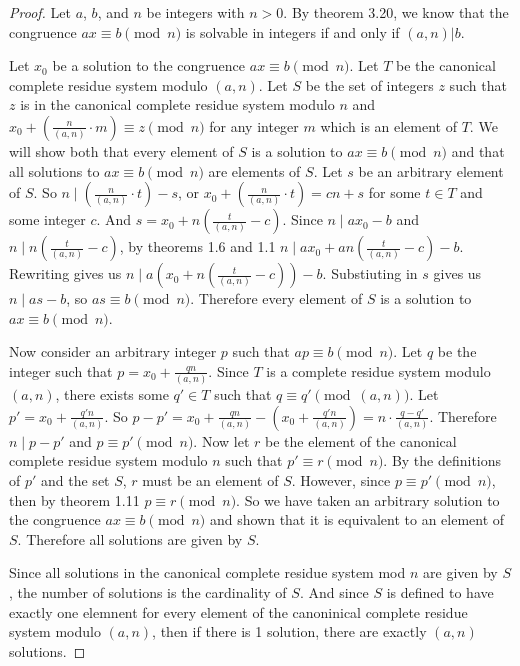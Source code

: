 \documentclass[12pt,leqno]{article}
\numberwithin{equation}{section}
\theoremstyle{definition}
\begin{document}
\pagebreak
\begin{proof}[Proof]
Let $a$, $b$, and $n$ be integers with $n > 0$.  By theorem 3.20, we know that the congruence $ax \equiv b \pmod{n}$ is solvable in integers if and only if $(a,n)|b$.  

Let $x_0$ be a solution to the congruence $ax \equiv b\pmod{n}$. Let $T$ be the canonical complete residue system modulo $(a, n)$.  Let $S$ be the set of integers $z$ such that $z$ is in the canonical complete residue system modulo $n$ and $x_0 + \left(\frac{n}{(a,n)}\cdot m\right) \equiv z \pmod{n}$ for any integer $m$ which is an element of $T$.  We will show both that every element of $S$ is a solution to $ax \equiv b\pmod{n}$ and that all solutions to $ax \equiv b\pmod{n}$ are elements of $S$.  Let $s$ be an arbitrary element of $S$.  So $n \mid \left(\frac{n}{(a,n)}\cdot t\right) - s$, or $x_0 + \left(\frac{n}{(a,n)}\cdot t\right) = cn + s$ for some $t \in T$ and some integer $c$.  And $s = x_0 + n\left(\frac{t}{(a,n)} - c\right)$.  Since $n \mid ax_0 - b$ and $n \mid n\left(\frac{t}{(a,n)} - c\right)$, by theorems 1.6 and 1.1 $n \mid ax_0 + an\left(\frac{t}{(a,n)} - c\right) - b$.  Rewriting gives us $n \mid a\left(x_0 + n\left(\frac{t}{(a,n)} - c\right)\right) - b$.  Substiuting in $s$ gives us $n \mid as - b$, so $as \equiv b \pmod{n}$.  Therefore every element of $S$ is a solution to $ax \equiv b \pmod{n}$.

Now consider an arbitrary integer $p$ such that $ap \equiv b \pmod{n}$.  Let $q$ be the integer such that $p = x_0 + \frac{qn}{(a, n)}$.  Since $T$ is a complete residue system modulo $(a, n)$, there exists some $q' \in T$ such that $q \equiv q' \pmod{(a, n)}$.  Let $p' = x_0 + \frac{q'n}{(a, n)}$.  So $p - p' = x_0 + \frac{qn}{(a, n)} - \left(x_0 + \frac{q'n}{(a, n)}\right) = n \cdot \frac{q - q'}{(a, n)}$.  Therefore $n \mid p - p'$ and $p \equiv p' \pmod{n}$.  Now let $r$ be the element of the canonical complete residue system modulo $n$ such that $p' \equiv r \pmod{n}$.  By the definitions of $p'$ and the set $S$, $r$ must be an element of $S$.  However, since $p \equiv p' \pmod{n}$, then by theorem 1.11 $p \equiv r \pmod{n}$.  So we have taken an arbitrary solution to the congruence $ax \equiv b \pmod{n}$ and shown that it is equivalent to an element of $S$.  Therefore all solutions are given by $S$.

Since all solutions in the canonical complete residue system mod $n$ are given by $S$, the number of solutions is the cardinality of $S$.  And since $S$ is defined to have exactly one elemnent for every element of the canoninical complete residue system modulo $(a, n)$, then if there is 1 solution, there are exactly $(a, n)$ solutions.
\end{proof}
\end{document}
